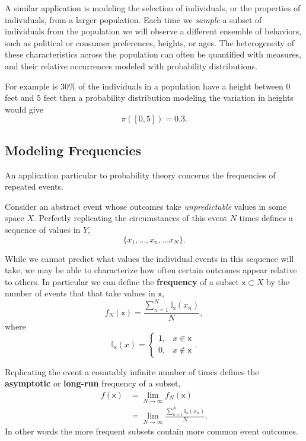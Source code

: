 \documentclass[
  letterpaper,
  DIV=11,
  numbers=noendperiod]{scrartcl}
\begin{document}
A similar application is modeling the selection of individuals, or the
properties of individuals, from a larger population. Each time we
\emph{sample} a subset of individuals from the population we will
observe a different ensemble of behaviors, such as political or consumer
preferences, heights, or ages. The heterogeneity of these
characteristics across the population can often be quantified with
measures, and their relative occurrences modeled with probability
distributions.

For example is \(30\%\) of the individuals in a population have a height
between \(0\) feet and \(5\) feet then a probability distribution
modeling the variation in heights would give \[
\pi([0, 5]) = 0.3.
\]

\hypertarget{modeling-frequencies}{%
\subsection{Modeling Frequencies}\label{modeling-frequencies}}

An application particular to probability theory concerns the frequencies
of repeated events.

Consider an abstract event whose outcomes take \emph{unpredictable}
values in some space \(X\). Perfectly replicating the circumstances of
this event \(N\) times defines a sequence of values in \(Y\), \[
\{ x_{1}, \ldots, x_{n}, \ldots x_{N} \}.
\]

While we cannot predict what values the individual events in this
sequence will take, we may be able to characterize how often certain
outcomes appear relative to others. In particular we can define the
\textbf{frequency} of a subset \(\mathsf{x} \subset X\) by the number of
events that that take values in \(\mathsf{x}\), \[
f_{N}(\mathsf{x})
= \frac{ \sum_{n = 1}^{N} \mathbb{I}_{\mathsf{x}}(x_{n}) }{N},
\] where \[
\mathbb{I}_{\mathsf{x}}(x)
=
\left\{
\begin{array}{rr}
1, & x \in \mathsf{x} \\
0, & x \notin \mathsf{x}
\end{array}
\right. .
\]

Replicating the event a countably infinite number of times defines the
\textbf{asymptotic} or \textbf{long-run} frequency of a subset,
\begin{align*}
f(\mathsf{x})
&=
\lim_{N \rightarrow \infty} f_{N}(\mathsf{x})
\\
&=
\lim_{N \rightarrow \infty}
\frac{ \sum_{n = 1}^{N} \mathbb{I}_{\mathsf{x}}(x_{n}) }{N}.
\end{align*} In other words the more frequent subsets contain more
common event outcomes.
\end{document}
